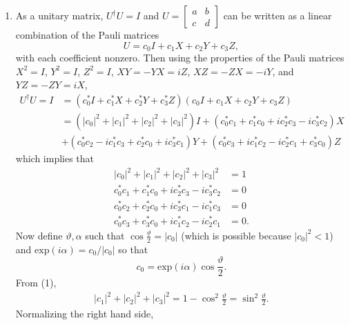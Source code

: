 \documentclass[a4paper,12pt]{article}
\begin{document}
\begin{enumerate}
\begin{enumerate}
            \item As a unitary matrix, $U^\dagger U = I$ and $U = 
                \left[ \begin{array}{cc}
                        a & b \\
                        c & d
                \end{array} \right]
                $
                can be written as a linear combination of the Pauli matrices
                \[
                    U = c_0 I + c_1 X + c_2 Y + c_3 Z,
                \]
                with each coefficient nonzero. Then using the properties of the Pauli matrices $X^2 = I$, $Y^2 = I$, $Z^2 = I$, $XY = -YX = iZ$, $XZ = -ZX = -iY$, and $YZ = -ZY = iX$,
                \begin{align*}
                    U^\dagger U = I &= (c_0^* I + c_1^* X + c_2^* Y + c_3^* Z)(c_0 I + c_1 X + c_2 Y + c_3 Z) \\
                    &= (|c_0|^2 + |c_1|^2 + |c_2|^2 + |c_3|^2)I + (c_0^* c_1 + c_1^* c_0 + i c_2^* c_3 - i c_3^* c_2)X \\
                    &+ (c_0^* c_2 - i c_1^* c_3 + c_2^* c_0 + i c_3^* c_1)Y + (c_0^* c_3 + i c_1^* c_2 - i c_2^* c_1 + c_3^* c_0)Z
                \end{align*}
                which implies that
                \begin{align}
                    |c_0|^2 + |c_1|^2 + |c_2|^2 + |c_3|^2 &= 1 \\
                    c_0^* c_1 + c_1^* c_0 + i c_2^* c_3 - i c_3^* c_2 &= 0 \\
                    c_0^* c_2 + c_2^* c_0 + i c_3^* c_1 - i c_1^* c_3 &= 0 \\
                    c_0^* c_3 + c_3^* c_0 + i c_1^* c_2 - i c_2^* c_1 &= 0.
                \end{align}
                Now define $\vartheta, \alpha$ such that $\cos{\frac{\vartheta}{2}} = |c_0|$ (which is possible because $|c_0|^2 < 1$) and $\mbox{exp}(i \alpha) = c_0 / |c_0|$ so that
                \[
                    c_0 = \mbox{exp}(i \alpha) \cos{\frac{\vartheta}{2}}.
                \]
                From (1),
                \begin{align*}
                    |c_1|^2 + |c_2|^2 + |c_3|^2 = 1 - \cos^2{\frac{\vartheta}{2}} = \sin^2{\frac{\vartheta}{2}}.
                \end{align*}
                Normalizing the right hand side,
                \begin{align*}

\end{align*}
\end{enumerate}
\end{enumerate}
\end{document}
